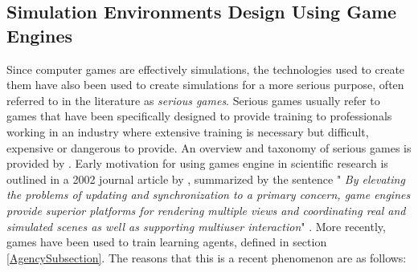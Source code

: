 \subsection{Simulation Environments Design Using Game Engines}\label{GameEngineReview}
Since computer games are effectively simulations, the technologies used to create them have also been used to create simulations for a more serious purpose, often referred to in the literature as \textit{serious games}. Serious games usually refer to games that have been specifically designed to provide training to professionals working in an industry where extensive training is necessary but difficult, expensive or dangerous to provide. An overview and taxonomy of serious games is provided by \citeauthor{Laamarti2014AnGames} \cite{Laamarti2014AnGames}. Early motivation for using games engine in scientific research is outlined in a 2002 journal article by \citeauthor{Lewis2002GameEnginesInScientificResearch}, summarized by the sentence "\textit{ By elevating the problems of updating and synchronization to a primary concern, game engines provide superior platforms for rendering multiple views and coordinating real and simulated scenes as well as supporting multiuser interaction}" \cite{Lewis2002GameEnginesInScientificResearch}.  More recently, games have been used to train learning agents, defined in section \ref{AgencySubsection}. The reasons that this is a recent phenomenon are as follows:
